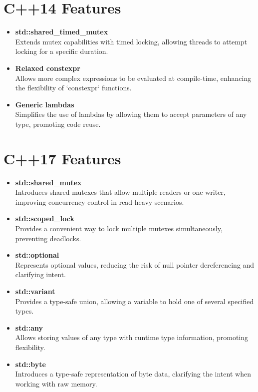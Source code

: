 \documentclass{article}
\begin{document}
\section*{C++14 Features}
\begin{itemize}
    \item \textbf{std::shared\_timed\_mutex} \\
    Extends mutex capabilities with timed locking, allowing threads to attempt locking for a specific duration.
    
    \item \textbf{Relaxed constexpr} \\
    Allows more complex expressions to be evaluated at compile-time, enhancing the flexibility of `constexpr` functions.
    
    \item \textbf{Generic lambdas} \\
    Simplifies the use of lambdas by allowing them to accept parameters of any type, promoting code reuse.
\end{itemize}

\section*{C++17 Features}
\begin{itemize}
    \item \textbf{std::shared\_mutex} \\
    Introduces shared mutexes that allow multiple readers or one writer, improving concurrency control in read-heavy scenarios.
    
    \item \textbf{std::scoped\_lock} \\
    Provides a convenient way to lock multiple mutexes simultaneously, preventing deadlocks.
    
    \item \textbf{std::optional} \\
    Represents optional values, reducing the risk of null pointer dereferencing and clarifying intent.
    
    \item \textbf{std::variant} \\
    Provides a type-safe union, allowing a variable to hold one of several specified types.
    
    \item \textbf{std::any} \\
    Allows storing values of any type with runtime type information, promoting flexibility.
    
    \item \textbf{std::byte} \\
    Introduces a type-safe representation of byte data, clarifying the intent when working with raw memory.
\end{itemize}
\end{document}
